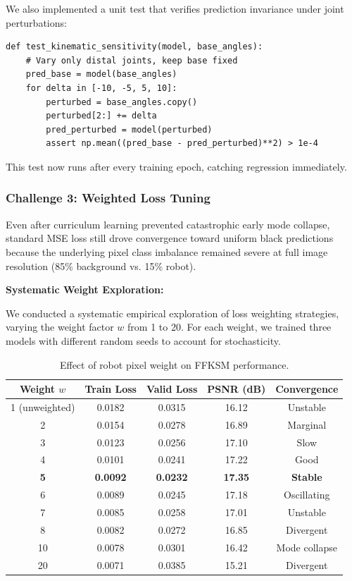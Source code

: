 \documentclass[12pt,a4paper,oneside]{report}
\begin{document}
We also implemented a unit test that verifies prediction invariance under joint perturbations:

{\footnotesize
\begin{verbatim}
def test_kinematic_sensitivity(model, base_angles):
    # Vary only distal joints, keep base fixed
    pred_base = model(base_angles)
    for delta in [-10, -5, 5, 10]:
        perturbed = base_angles.copy()
        perturbed[2:] += delta
        pred_perturbed = model(perturbed)
        assert np.mean((pred_base - pred_perturbed)**2) > 1e-4
\end{verbatim}
}

This test now runs after every training epoch, catching regression immediately.

\subsubsection{Challenge 3: Weighted Loss Tuning}
\label{subsubsec:challenge_3_weighted_loss_tuning}

Even after curriculum learning prevented catastrophic early mode collapse, standard MSE loss still drove convergence toward uniform black predictions because the underlying pixel class imbalance remained severe at full image resolution (85\% background vs. 15\% robot).

\textbf{Systematic Weight Exploration:}

We conducted a systematic empirical exploration of loss weighting strategies, varying the weight factor $w$ from 1 to 20. For each weight, we trained three models with different random seeds to account for stochasticity.

\begin{table}[H]
\centering
\caption{Effect of robot pixel weight on FFKSM performance.}
\label{tab:weight_tuning}
\begin{tabular}{ccccc}
\toprule
Weight $w$ & Train Loss & Valid Loss & PSNR (dB) & Convergence \\
\midrule
1 (unweighted) & 0.0182 & 0.0315 & 16.12 & Unstable \\
2 & 0.0154 & 0.0278 & 16.89 & Marginal \\
3 & 0.0123 & 0.0256 & 17.10 & Slow \\
4 & 0.0101 & 0.0241 & 17.22 & Good \\
\textbf{5} & \textbf{0.0092} & \textbf{0.0232} & \textbf{17.35} & \textbf{Stable} \\
6 & 0.0089 & 0.0245 & 17.18 & Oscillating \\
7 & 0.0085 & 0.0258 & 17.01 & Unstable \\
8 & 0.0082 & 0.0272 & 16.85 & Divergent \\
10 & 0.0078 & 0.0301 & 16.42 & Mode collapse \\
20 & 0.0071 & 0.0385 & 15.21 & Divergent \\
\bottomrule
\end{tabular}
\end{table}
\end{document}
